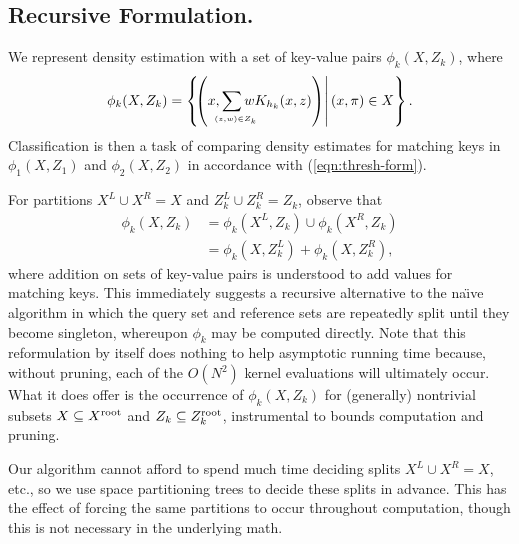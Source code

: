 \documentclass[twoside,leqno,twocolumn]{article}
\newcommand{\kdroot}[1]{#1^{\rm root}}
\newcommand{\kdleft}[1]{#1^{\!L}}
\newcommand{\kdright}[1]{#1^{\!R}}
\newcommand{\leftlim}[1]{\lefteqn{\scriptscriptstyle #1}}
\begin{document}
\subsection{Recursive Formulation.}
We represent density estimation with a set of key-value pairs
$\phi_k(X,Z_k)$, where
\begin{equation}
  \phi_k(X,Z_k) = \left\{ \!\! \left. \left( x, \sum_{\leftlim{(z,w) \in Z_k}} w K_{h_k}(x,z) \right) \right|
(x,\pi) \in X
  \right\} .
\end{equation}
Classification is then a task of comparing density estimates for
matching keys in $\phi_1(X,Z_1)$ and $\phi_2(X,Z_2)$ in accordance with
(\ref{eqn:thresh-form}).

For partitions $\kdleft{X} \cup \kdright{X} = X$ and $\kdleft{Z_k} \cup
\kdright{Z_k} = Z_k$, observe that
\begin{align}
  \label{eqn:q-split} \phi_k(X,Z_k) & = \phi_k(\kdleft{X},Z_k) \cup \phi_k(\kdright{X},Z_k) \\
  \label{eqn:r-split} & = \phi_k(X,\kdleft{Z_k}) + \phi_k(X,\kdright{Z_k}) ,
\end{align}
where addition on sets of key-value pairs is understood to add values
for matching keys.  This immediately suggests a recursive alternative
to the na\"{\i}ve algorithm in which the query set and reference sets
are repeatedly split until they become singleton, whereupon $\phi_k$ may
be computed directly.  Note that this reformulation by itself does
nothing to help asymptotic running time because, without pruning, each
of the $O(N^2)$ kernel evaluations will ultimately occur.  What it
does offer is the occurrence of $\phi_k(X,Z_k)$ for (generally)
nontrivial subsets $X \subseteq \kdroot{X}$ and $Z_k \subseteq
\kdroot{Z_k}$, instrumental to bounds computation and pruning.

Our algorithm cannot afford to spend much time deciding splits
$\kdleft{X} \cup \kdright{X} = X$, etc., so we use space partitioning
trees to decide these splits in advance.  This has the effect of
forcing the same partitions to occur throughout computation, though
this is not necessary in the underlying math.
\end{document}

